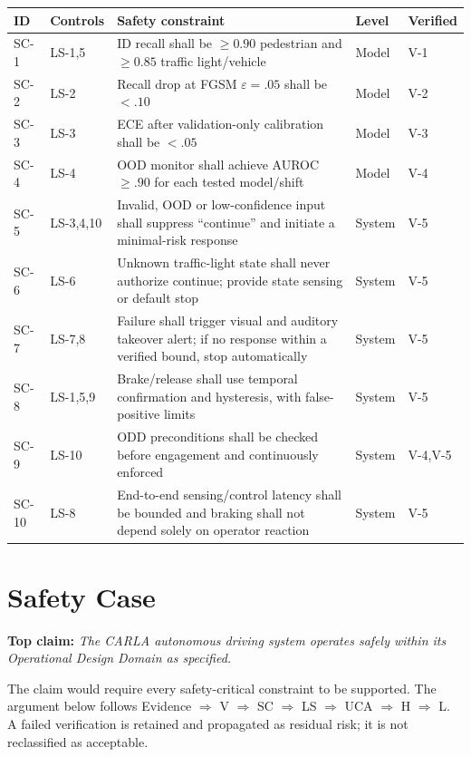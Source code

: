 \documentclass[nologo,a4paper,12pt]{article}
\begin{document}
{\footnotesize
\begin{tabularx}{\linewidth}{@{}p{1.0cm}p{1.5cm}Yp{1.35cm}p{1.3cm}@{}}
\toprule
\textbf{ID} & \textbf{Controls} & \textbf{Safety constraint} & \textbf{Level} & \textbf{Verified} \\
\midrule
SC-1 & LS-1,5 & ID recall shall be $\geq0.90$ pedestrian and $\geq0.85$ traffic light/vehicle & Model & V-1 \\
SC-2 & LS-2 & Recall drop at FGSM $\varepsilon=.05$ shall be $<.10$ & Model & V-2 \\
SC-3 & LS-3 & ECE after validation-only calibration shall be $<.05$ & Model & V-3 \\
SC-4 & LS-4 & OOD monitor shall achieve AUROC $\geq.90$ for each tested model/shift & Model & V-4 \\
SC-5 & LS-3,4,10 & Invalid, OOD or low-confidence input shall suppress ``continue'' and initiate a minimal-risk response & System & V-5 \\
SC-6 & LS-6 & Unknown traffic-light state shall never authorize continue; provide state sensing or default stop & System & V-5 \\
SC-7 & LS-7,8 & Failure shall trigger visual and auditory takeover alert; if no response within a verified bound, stop automatically & System & V-5 \\
SC-8 & LS-1,5,9 & Brake/release shall use temporal confirmation and hysteresis, with false-positive limits & System & V-5 \\
SC-9 & LS-10 & ODD preconditions shall be checked before engagement and continuously enforced & System & V-4,V-5 \\
SC-10 & LS-8 & End-to-end sensing/control latency shall be bounded and braking shall not depend solely on operator reaction & System & V-5 \\
\bottomrule
\end{tabularx}}

\clearpage
\section{Safety Case}
\label{sec:safety-case}

\begin{mdframed}[style=claimstyle]
\textbf{Top claim:} \textit{The CARLA autonomous driving system operates safely within its
Operational Design Domain as specified.}
\end{mdframed}

The claim would require every safety-critical constraint to be supported. The argument below
follows Evidence $\Rightarrow$ V $\Rightarrow$ SC $\Rightarrow$ LS $\Rightarrow$ UCA
$\Rightarrow$ H $\Rightarrow$ L. A failed verification is retained and propagated as residual
risk; it is not reclassified as acceptable.
\end{document}
